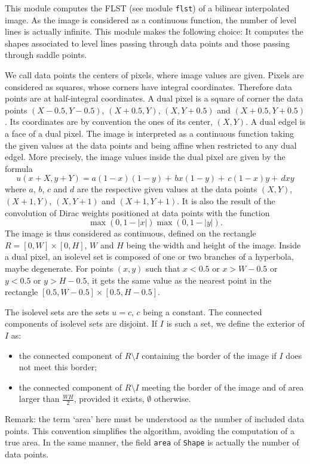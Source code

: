 This module computes the FLST (see module \texttt{flst}) of a bilinear
interpolated image. As the image is considered as a continuous function, the
number of level lines is actually infinite. This module makes the following
choice: It computes the shapes associated to level lines passing through data
points and those passing through saddle points.

We call data points the centers of pixels, where image values are
given. Pixels are considered as squares, whose corners have integral
coordinates. Therefore data points are at half-integral coordinates.
A dual pixel is a square of corner the data points
$(X-0.5,Y-0.5)$, $(X+0.5,Y)$, $(X,Y+0.5)$ and $(X+0.5,Y+0.5)$. Its coordinates
are by convention the ones of its center, $(X,Y)$. A dual edgel is a face of
a dual pixel. The image is interpreted as a continuous function taking the
given values at the data points and being affine when restricted to any dual
edgel. More precisely, the image values inside the dual pixel are given by the
formula
$$
u(x+X,y+Y) = a (1-x)(1-y) +\,b x(1-y) +\,c (1-x)y +\,d xy
$$
where $a$, $b$, $c$ and $d$ are the respective given values at the data points
$(X,Y)$, $(X+1,Y)$, $(X,Y+1)$ and $(X+1,Y+1)$. It is also the result of the
convolution of Dirac weights positioned at data points with the function
$$
\max(0, 1-|x|)\max(0, 1-|y|).
$$
The image is thus considered as continuous, defined on the rectangle
$R = [0,W]\times [0,H]$, $W$ and $H$ being the width and
height of the image. Inside a dual pixel, an isolevel set is composed of one
or two branches of a hyperbola, maybe degenerate. For points $(x,y)$ such that
$x < 0.5$ or $x > W-0.5$ or $y <0.5$ or $y > H-0.5$, it gets the same value as
the nearest point in the rectangle $[0.5,W-0.5]\times [0.5,H-0.5]$.

The isolevel sets are the sets $u=c$, $c$ being a constant. The connected
components of isolevel sets are disjoint. If $I$ is such a set, we define the
exterior of $I$ as:
\begin{itemize}
\item the connected component of $R\setminus I$ containing the border of the
image if $I$ does not meet this border;
\item the connected component of $R\setminus I$ meeting the border of the
image and of area larger than $\frac{WH}{2}$, provided it exists, $\emptyset$
otherwise.
\end{itemize}
Remark: the term `area' here must be understood as the number of included data
points. This convention simplifies the algorithm, avoiding the computation of
a true area. In the same manner, the field \texttt{area} of \texttt{Shape} is
actually the number of data points.

